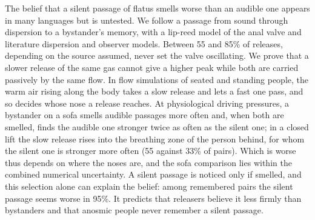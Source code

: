 The belief that a silent passage of flatus smells worse than an audible one appears in many languages but is untested.
We follow a passage from sound through dispersion to a bystander's memory, with a lip-reed model of the anal valve and
literature dispersion and observer models. Between 55 and 85\% of releases, depending on the source assumed, never set the valve oscillating. We prove that a
slower release of the same gas cannot give a higher peak while both are carried passively by the same flow. In flow
simulations of seated and standing people, the warm air rising along the body takes a slow release and lets a fast one
pass, and so decides whose nose a release reaches. At physiological driving pressures, a bystander on a sofa smells
audible passages more often and, when both are smelled, finds the audible one stronger twice as often as the silent
one; in a closed lift the slow release rises into the breathing zone of the person behind, for whom the silent one is
stronger more often (55 against 33\% of pairs). Which is worse thus depends on where the noses are, and the sofa
comparison lies within the combined numerical uncertainty. A silent passage is noticed only if smelled, and this
selection alone can explain the belief: among remembered pairs the silent passage seems worse in 95\%. It predicts that
releasers believe it less firmly than bystanders and that anosmic people never remember a silent passage.
